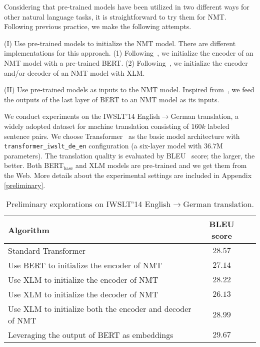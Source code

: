 \documentclass{article} \usepackage{iclr2020_conference,times}
\begin{document}
Considering that pre-trained models have been utilized in two different ways for other natural language tasks, it is straightforward to try them for NMT. Following previous practice, we make the following attempts.

\noindent(I) Use pre-trained models to initialize the NMT model. There are different implementations for this approach. (1) Following~\citep{devlin2018bert}, we initialize the encoder of an NMT model with a pre-trained BERT. (2) Following~\citep{lample2019cross}, we initialize the encoder and/or decoder of an NMT model with XLM. 

\noindent(II) Use pre-trained models as inputs to the NMT model. Inspired from~\citep{peters2018deep}, we feed the outputs of the last layer of BERT to an NMT model as its inputs.

We conduct experiments on the IWSLT'14 English$\to$German translation, a widely adopted dataset for machine translation consisting of $160k$ labeled sentence pairs. We choose Transformer~\citep{vaswani2017attention} as the basic model architecture with \texttt{transformer\_iwslt\_de\_en} configuration (a six-layer model with $36.7$M parameters). The translation quality is evaluated by BLEU~\citep{papineni2002bleu} score; the larger, the better. Both BERT$_{\text{base}}$ and XLM models are pre-trained and we get them from the Web. More details about the experimental settings are included in Appendix \ref{preliminary}.

\begin{table}[!htbp]
    \small
	\centering
	\caption{Preliminary explorations on IWSLT'14 English$\to$German translation.}
	\begin{tabular}{lcc}
		\toprule
		Algorithm & BLEU score  \\
		\midrule
		Standard Transformer  & $28.57$  \\
		\midrule
		Use BERT to initialize the encoder of NMT & $27.14$ \\
		Use XLM to initialize the encoder of NMT & $28.22$  \\
		Use XLM to initialize the decoder of NMT & $26.13$  \\
		Use XLM to initialize both the encoder and decoder of NMT & $28.99$ \\
		\midrule
		Leveraging the output of BERT as embeddings & $29.67$ \\
		\bottomrule
	\end{tabular}
	\label{tab:results_iwslt_first_explore}
\end{table}
\end{document}
